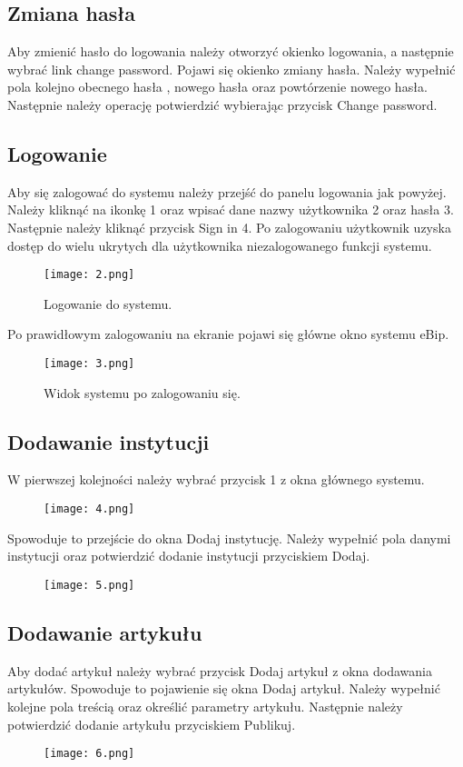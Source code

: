 \documentclass{article}
\begin{document}
\subsection{Zmiana hasła}
	Aby zmienić hasło do logowania należy otworzyć okienko logowania, a następnie wybrać link change password. Pojawi się okienko zmiany hasła. Należy wypełnić pola kolejno obecnego hasła , nowego hasła  oraz powtórzenie nowego hasła. Następnie należy operację potwierdzić wybierając przycisk Change password.
\newpage
\subsection{Logowanie}
	Aby się zalogować do systemu należy przejść do panelu logowania jak powyżej. Należy kliknąć na ikonkę 1 oraz wpisać dane nazwy użytkownika 2 oraz hasła 3. Następnie należy kliknąć przycisk Sign in 4. Po zalogowaniu użytkownik uzyska dostęp do wielu ukrytych dla użytkownika niezalogowanego funkcji systemu.
\begin{figure}[h!]
	\texttt{[image: 2.png]}
	\centering
	\caption{Logowanie do systemu.}
\end{figure}

	Po prawidłowym zalogowaniu na ekranie pojawi się główne okno systemu eBip.

\begin{figure}[h!]
	\texttt{[image: 3.png]}
	\centering
	\caption{Widok systemu po zalogowaniu się.}
\end{figure}
\newpage

\subsection{Dodawanie instytucji}
	W pierwszej kolejności należy wybrać przycisk 1 z okna głównego systemu.
\begin{figure}[h!]
	\texttt{[image: 4.png]}
	\centering
\end{figure}

	Spowoduje to przejście do okna Dodaj instytucję. Należy wypełnić pola danymi instytucji oraz potwierdzić dodanie instytucji przyciskiem Dodaj.	

\begin{figure}[h!]
	\texttt{[image: 5.png]}
	\centering
\end{figure}
\subsection{Dodawanie artykułu}
	Aby dodać artykuł należy wybrać przycisk Dodaj artykuł z okna dodawania artykułów. Spowoduje to pojawienie się okna Dodaj artykuł. Należy wypełnić kolejne pola treścią oraz określić parametry artykułu. Następnie należy potwierdzić dodanie artykułu przyciskiem Publikuj.	
\begin{figure}[h!]
	\texttt{[image: 6.png]}
	\centering
\end{figure}
\end{document}
